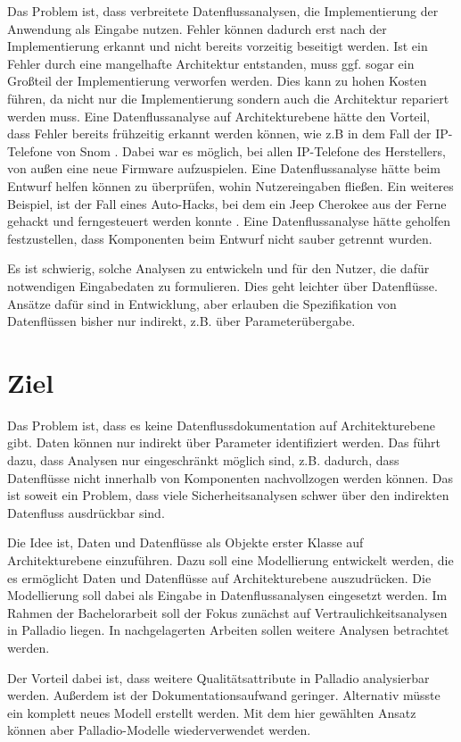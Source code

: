 Das Problem ist, dass verbreitete Datenflussanalysen, die Implementierung der Anwendung als Eingabe nutzen. Fehler können dadurch erst nach der Implementierung erkannt und nicht bereits vorzeitig beseitigt werden. Ist ein Fehler durch eine mangelhafte Architektur entstanden, muss ggf. sogar ein Großteil der Implementierung verworfen werden. Dies kann zu hohen Kosten führen, da nicht nur die Implementierung sondern auch die Architektur repariert werden muss. Eine Datenflussanalyse auf Architekturebene hätte den Vorteil, dass Fehler bereits frühzeitig erkannt werden können, wie z.B in dem Fall der IP-Telefone von Snom \cite{IPTelefon}. Dabei war es möglich, bei allen IP-Telefone des Herstellers, von außen eine neue Firmware aufzuspielen. Eine Datenflussanalyse hätte beim Entwurf helfen können zu überprüfen, wohin Nutzereingaben fließen. 
Ein weiteres Beispiel, ist der Fall eines Auto-Hacks, bei dem ein Jeep Cherokee aus der Ferne gehackt und ferngesteuert werden konnte \cite{Cherokee}. Eine Datenflussanalyse hätte geholfen festzustellen, dass Komponenten beim Entwurf nicht sauber getrennt wurden. \par
Es ist schwierig, solche Analysen zu entwickeln und für den Nutzer, die dafür notwendigen Eingabedaten zu formulieren. Dies geht leichter über Datenflüsse. Ansätze dafür sind in Entwicklung, aber erlauben die Spezifikation von Datenflüssen bisher nur indirekt, z.B. über Parameterübergabe.

\section{Ziel}
\label{sec:zielDieserArbeit}
Das Problem ist, dass es keine Datenflussdokumentation auf Architekturebene gibt. Daten können nur indirekt über Parameter identifiziert werden. Das führt dazu, dass Analysen nur eingeschränkt möglich sind, z.B. dadurch, dass Datenflüsse nicht innerhalb von Komponenten nachvollzogen werden können.
Das ist soweit ein Problem, dass viele Sicherheitsanalysen schwer über den indirekten Datenfluss ausdrückbar sind. \par
Die Idee ist, Daten und Datenflüsse als Objekte erster Klasse auf Architekturebene einzuführen. Dazu soll eine Modellierung entwickelt werden, die es ermöglicht Daten und Datenflüsse auf Architekturebene auszudrücken. Die Modellierung soll dabei als Eingabe in Datenflussanalysen eingesetzt werden. Im Rahmen der Bachelorarbeit soll der Fokus zunächst auf Vertraulichkeitsanalysen in Palladio liegen. In nachgelagerten Arbeiten sollen weitere Analysen betrachtet werden. \par
Der Vorteil dabei ist, dass weitere Qualitätsattribute in Palladio analysierbar werden. Außerdem ist der Dokumentationsaufwand geringer. Alternativ müsste ein komplett neues Modell erstellt werden. Mit dem hier gewählten Ansatz können aber Palladio-Modelle wiederverwendet werden.

